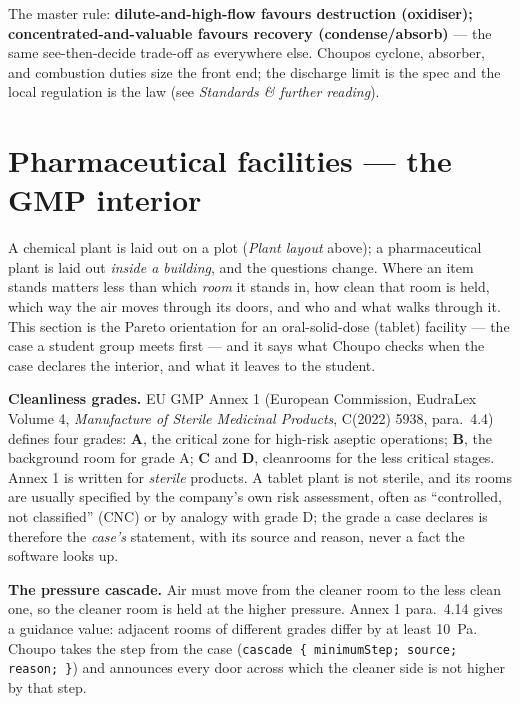 \documentclass[11pt,a4paper]{article}
\begin{document}
The master rule: \textbf{dilute-and-high-flow favours destruction
(oxidiser); concentrated-and-valuable favours recovery
(condense/absorb)} --- the same see-then-decide trade-off as everywhere
else. Choupo\textquotesingle s cyclone, absorber, and combustion duties
size the front end; the discharge limit is the spec and the local
regulation is the law (see \emph{Standards \& further reading}).

\hypertarget{pharmaceutical-facilities-the-gmp-interior}{%
\section{Pharmaceutical facilities --- the GMP
interior}\label{pharmaceutical-facilities-the-gmp-interior}}\label{sec:gmp-interior}

A chemical plant is laid out on a plot (\emph{Plant layout} above); a
pharmaceutical plant is laid out \emph{inside a building}, and the
questions change. Where an item stands matters less than which
\emph{room} it stands in, how clean that room is held, which way the air
moves through its doors, and who and what walks through it. This section
is the Pareto orientation for an oral-solid-dose (tablet) facility ---
the case a student group meets first --- and it says what Choupo checks
when the case declares the interior, and what it leaves to the student.

\textbf{Cleanliness grades.} EU GMP Annex 1 (European Commission,
EudraLex Volume 4, \emph{Manufacture of Sterile Medicinal Products},
C(2022) 5938, para.~4.4) defines four grades: \textbf{A}, the critical
zone for high-risk aseptic operations; \textbf{B}, the background room
for grade A; \textbf{C} and \textbf{D}, cleanrooms for the less critical
stages. Annex 1 is written for \emph{sterile} products. A tablet plant
is not sterile, and its rooms are usually specified by the company's own
risk assessment, often as ``controlled, not classified'' (CNC) or by
analogy with grade D; the grade a case declares is therefore the
\emph{case's} statement, with its source and reason, never a fact the
software looks up.

\textbf{The pressure cascade.} Air must move from the cleaner room to the
less clean one, so the cleaner room is held at the higher pressure.
Annex 1 para.~4.14 gives a guidance value: adjacent rooms of different
grades differ by at least 10~Pa. Choupo takes the step from the case
(\texttt{cascade \{ minimumStep; source; reason; \}}) and announces every
door across which the cleaner side is not higher by that step.
\end{document}

